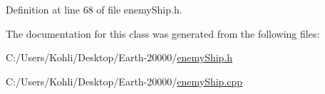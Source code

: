Definition at line 68 of file enemyShip.h.

The documentation for this class was generated from the following files:\begin{DoxyCompactItemize}
\item 
C:/Users/Kohli/Desktop/Earth-\/20000/\hyperlink{enemy_ship_8h}{enemyShip.h}\item 
C:/Users/Kohli/Desktop/Earth-\/20000/\hyperlink{enemy_ship_8cpp}{enemyShip.cpp}\end{DoxyCompactItemize}
